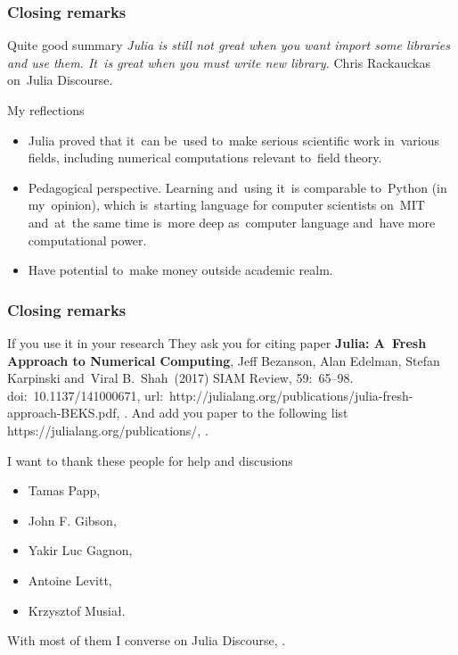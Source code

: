 \documentclass{beamer}  %
\begin{document}
\begin{frame}
  \frametitle{Closing remarks}

  \begin{block}{Quite good summary}
    \emph{Julia is still not great when you want import some libraries
      and use them. It~is great when you must write new library.}
    Chris Rackauckas on~Julia Discourse.
  \end{block}

  \begin{block}{My reflections}
    \begin{itemize}
    \item Julia proved that it~can be~used to~make serious scientific
      work in~various fields, including numerical computations
      relevant to~field theory.
    \item Pedagogical perspective. Learning and~using it~is comparable
      to~Python (in my~opinion), which is~starting language for
      computer scientists on~MIT and~at~the same time is~more deep
      as~computer language and~have more computational power.
    \item Have potential to~make money outside academic realm.
    \end{itemize}
  \end{block}

\end{frame}





\begin{frame}
  \frametitle{Closing remarks}

  \begin{block}{If you use it in your research}
    They ask you for citing paper \textbf{Julia: A~Fresh Approach to
      Numerical Computing}, Jeff Bezanson, Alan Edelman, Stefan
    Karpinski and~Viral B.~Shah~(2017) SIAM Review, 59:~65--98.
    doi:~10.1137/141000671,
    url:~http://julialang.org/publications/julia-fresh-approach-BEKS.pdf,
    .
    And add you paper to the following list
    https://julialang.org/publications/,
    .
  \end{block}

  \begin{block}{I want to thank these people for help and discusions}
    \begin{itemize}
    \item Tamas Papp,
    \item John F. Gibson,
    \item Yakir Luc Gagnon,
    \item Antoine Levitt,
    \item Krzysztof Musiał.
    \end{itemize}
    With most of them I converse on Julia Discourse,
    .
  \end{block}

\end{frame}
\end{document}
